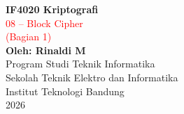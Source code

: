 \documentclass{article}
\begin{document}

\begin{center}
\textbf{IF4020 Kriptografi}\\[1cm]
\Huge\textcolor{red}{08 -- Block Cipher}\\[0.5cm]
\Large\textcolor{red}{(Bagian 1)}\\[1cm]
\large\textbf{Oleh: Rinaldi M}\\[1cm]
Program Studi Teknik Informatika \\
Sekolah Teknik Elektro dan Informatika \\
Institut Teknologi Bandung \\
2026
\end{center}
\end{document}
